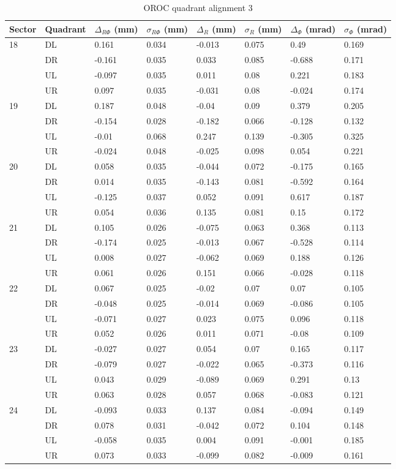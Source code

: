 \begin{table}
\caption{OROC quadrant alignment 3}
\begin{tabular}{|l|l|l|l|l|l|l|l|} \hline
Sector & Quadrant & $\Delta_{R\Phi}$ (mm)& $\sigma_{R\Phi}$ (mm) &
 $\Delta_{R}$ (mm)& $\sigma_{R}$ (mm) & $\Delta_{\Phi}$ (mrad)& $\sigma_{\Phi}$ (mrad)\\ \hline
18&DL&0.161&0.034&-0.013&0.075&0.49&0.169\\ \hline
&DR&-0.161&0.035&0.033&0.085&-0.688&0.171\\ \hline
&UL&-0.097&0.035&0.011&0.08&0.221&0.183\\ \hline
&UR&0.097&0.035&-0.031&0.08&-0.024&0.174\\ \hline
19&DL&0.187&0.048&-0.04&0.09&0.379&0.205\\ \hline
&DR&-0.154&0.028&-0.182&0.066&-0.128&0.132\\ \hline
&UL&-0.01&0.068&0.247&0.139&-0.305&0.325\\ \hline
&UR&-0.024&0.048&-0.025&0.098&0.054&0.221\\ \hline
20&DL&0.058&0.035&-0.044&0.072&-0.175&0.165\\ \hline
&DR&0.014&0.035&-0.143&0.081&-0.592&0.164\\ \hline
&UL&-0.125&0.037&0.052&0.091&0.617&0.187\\ \hline
&UR&0.054&0.036&0.135&0.081&0.15&0.172\\ \hline
21&DL&0.105&0.026&-0.075&0.063&0.368&0.113\\ \hline
&DR&-0.174&0.025&-0.013&0.067&-0.528&0.114\\ \hline
&UL&0.008&0.027&-0.062&0.069&0.188&0.126\\ \hline
&UR&0.061&0.026&0.151&0.066&-0.028&0.118\\ \hline
22&DL&0.067&0.025&-0.02&0.07&0.07&0.105\\ \hline
&DR&-0.048&0.025&-0.014&0.069&-0.086&0.105\\ \hline
&UL&-0.071&0.027&0.023&0.075&0.096&0.118\\ \hline
&UR&0.052&0.026&0.011&0.071&-0.08&0.109\\ \hline
23&DL&-0.027&0.027&0.054&0.07&0.165&0.117\\ \hline
&DR&-0.079&0.027&-0.022&0.065&-0.373&0.116\\ \hline
&UL&0.043&0.029&-0.089&0.069&0.291&0.13\\ \hline
&UR&0.063&0.028&0.057&0.068&-0.083&0.121\\ \hline
24&DL&-0.093&0.033&0.137&0.084&-0.094&0.149\\ \hline
&DR&0.078&0.031&-0.042&0.072&0.104&0.148\\ \hline
&UL&-0.058&0.035&0.004&0.091&-0.001&0.185\\ \hline
&UR&0.073&0.033&-0.099&0.082&-0.009&0.161\\ \hline
\end{tabular}
\label{table:QudrantAlignement}
\end{table}
